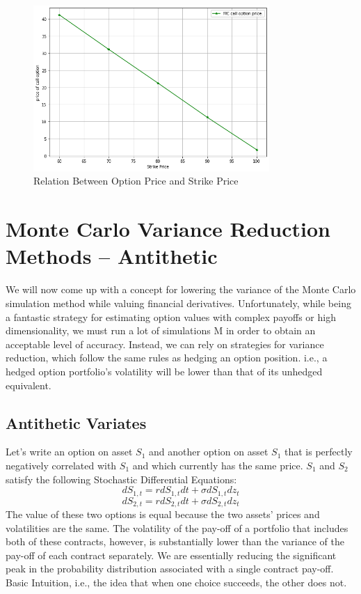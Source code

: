 \begin{figure}[H]
	\begin{center}
		\includegraphics[width=0.8\textwidth]{MC_Strike_Price}
	\end{center}
	\caption{Relation Between Option Price and Strike Price}
\end{figure}
\section{Monte Carlo Variance Reduction Methods – Antithetic}
\noindent We will now come up with a concept for lowering the variance of the Monte Carlo simulation method while valuing financial derivatives. Unfortunately, while being a fantastic strategy for estimating option values with complex payoffs or high dimensionality, we must run a lot of simulations M in order to obtain an acceptable level of accuracy. Instead, we can rely on strategies for variance reduction, which follow the same rules as hedging an option position. i.e., a hedged option portfolio's volatility will be lower than that of its unhedged equivalent.
\subsection{Antithetic Variates}
\noindent Let’s write an option on asset $S_{1}$
and another option on asset $S_{1}$
that is perfectly negatively correlated with $S_{1}$ and which currently has the same price. $S_{1}$
and $S_{2}$ satisfy the following Stochastic Differential Equations:
$$dS_{1,t}=rdS_{1,t}dt+\sigma dS_{1,t}dz_{t}$$
$$dS_{2,t}=rdS_{2,t}dt+\sigma dS_{2,t}dz_{t}$$
The value of these two options is equal because the two assets' prices and volatilities are the same. The volatility of the pay-off of a portfolio that includes both of these contracts, however, is substantially lower than the variance of the pay-off of each contract separately. We are essentially reducing the significant peak in the probability distribution associated with a single contract pay-off. Basic Intuition, i.e., the idea that when one choice succeeds, the other does not.

